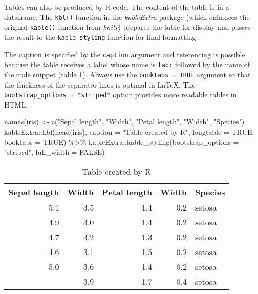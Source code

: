 \documentclass[fleqn,]{article} %
\newenvironment{Shaded}{\begin{snugshade}}{\end{snugshade}}
\newcommand{\ConstantTok}[1]{\textcolor[rgb]{0.00,0.00,0.00}{{#1}}}
\newcommand{\SpecialCharTok}[1]{\textcolor[rgb]{0.00,0.00,0.00}{{#1}}}
\newcommand{\StringTok}[1]{\textcolor[rgb]{0.31,0.60,0.02}{{#1}}}
\newcommand{\OtherTok}[1]{\textcolor[rgb]{0.56,0.35,0.01}{{#1}}}
\newcommand{\FunctionTok}[1]{\textcolor[rgb]{0.00,0.00,0.00}{{#1}}}
\newcommand{\AttributeTok}[1]{\textcolor[rgb]{0.77,0.63,0.00}{{#1}}}
\newcommand{\NormalTok}[1]{{#1}}
\begin{document}
Tables can also be produced by R code.
The content of the table is in a dataframe.
The \texttt{kbl()} function in the \emph{kableExtra} package (which enhances the original \texttt{kable()} function from \emph{knitr}) prepares the table for display and passes the result to the \texttt{kable\_styling} function for final formatting.

The caption is specified by the \texttt{caption} argument and referencing is possible because the table receives a label whose name is \texttt{tab:} followed by the name of the code snippet (table \ref{tab:kable}).
Always use the \texttt{booktabs\ =\ TRUE} argument so that the thickness of the separator lines is optimal in LaTeX.
The \texttt{bootstrap\_options\ =\ "striped"} option provides more readable tables in HTML.

\scriptsize

\begin{Shaded}
\begin{Highlighting}[]
\FunctionTok{names}\NormalTok{(iris) }\OtherTok{\textless{}{-}} \FunctionTok{c}\NormalTok{(}\StringTok{"Sepal length"}\NormalTok{, }\StringTok{"Width"}\NormalTok{, }\StringTok{"Petal length"}\NormalTok{,}
    \StringTok{"Width"}\NormalTok{, }\StringTok{"Species"}\NormalTok{)}
\NormalTok{kableExtra}\SpecialCharTok{::}\FunctionTok{kbl}\NormalTok{(}\FunctionTok{head}\NormalTok{(iris), }\AttributeTok{caption =} \StringTok{"Table created by R"}\NormalTok{,}
    \AttributeTok{longtable =} \ConstantTok{TRUE}\NormalTok{, }\AttributeTok{booktabs =} \ConstantTok{TRUE}\NormalTok{) }\SpecialCharTok{\%\textgreater{}\%}
\NormalTok{    kableExtra}\SpecialCharTok{::}\FunctionTok{kable\_styling}\NormalTok{(}\AttributeTok{bootstrap\_options =} \StringTok{"striped"}\NormalTok{,}
        \AttributeTok{full\_width =} \ConstantTok{FALSE}\NormalTok{)}
\end{Highlighting}
\end{Shaded}

\begin{longtable}[t]{rrrrl}
\caption{\label{tab:kable}Table created by R}\\
\toprule
Sepal length & Width & Petal length & Width & Species\\
\midrule
5.1 & 3.5 & 1.4 & 0.2 & setosa\\
4.9 & 3.0 & 1.4 & 0.2 & setosa\\
4.7 & 3.2 & 1.3 & 0.2 & setosa\\
4.6 & 3.1 & 1.5 & 0.2 & setosa\\
5.0 & 3.6 & 1.4 & 0.2 & setosa\\
\addlinespace
5.4 & 3.9 & 1.7 & 0.4 & setosa\\
\bottomrule
\end{longtable}
\end{document}
